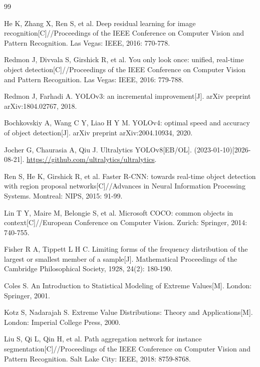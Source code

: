 \begin{thebibliography}{99}
\sloppy{}
\setlength{\itemsep}{2pt}

 He K, Zhang X, Ren S, et al. Deep residual learning for image recognition[C]//Proceedings of the IEEE Conference on Computer Vision and Pattern Recognition. Las Vegas: IEEE, 2016: 770-778.

 Redmon J, Divvala S, Girshick R, et al. You only look once: unified, real-time object detection[C]//Proceedings of the IEEE Conference on Computer Vision and Pattern Recognition. Las Vegas: IEEE, 2016: 779-788.

 Redmon J, Farhadi A. YOLOv3: an incremental improvement[J]. arXiv preprint arXiv:1804.02767, 2018.

 Bochkovskiy A, Wang C Y, Liao H Y M. YOLOv4: optimal speed and accuracy of object detection[J]. arXiv preprint arXiv:2004.10934, 2020.

 Jocher G, Chaurasia A, Qiu J. Ultralytics YOLOv8[EB/OL]. (2023-01-10)[2026-08-21]. \url{https://github.com/ultralytics/ultralytics}.

 Ren S, He K, Girshick R, et al. Faster R-CNN: towards real-time object detection with region proposal networks[C]//Advances in Neural Information Processing Systems. Montreal: NIPS, 2015: 91-99.

 Lin T Y, Maire M, Belongie S, et al. Microsoft COCO: common objects in context[C]//European Conference on Computer Vision. Zurich: Springer, 2014: 740-755.

 Fisher R A, Tippett L H C. Limiting forms of the frequency distribution of the largest or smallest member of a sample[J]. Mathematical Proceedings of the Cambridge Philosophical Society, 1928, 24(2): 180-190.

 Coles S. An Introduction to Statistical Modeling of Extreme Values[M]. London: Springer, 2001.

 Kotz S, Nadarajah S. Extreme Value Distributions: Theory and Applications[M]. London: Imperial College Press, 2000.

 Liu S, Qi L, Qin H, et al. Path aggregation network for instance segmentation[C]//Proceedings of the IEEE Conference on Computer Vision and Pattern Recognition. Salt Lake City: IEEE, 2018: 8759-8768.


\end{thebibliography}
